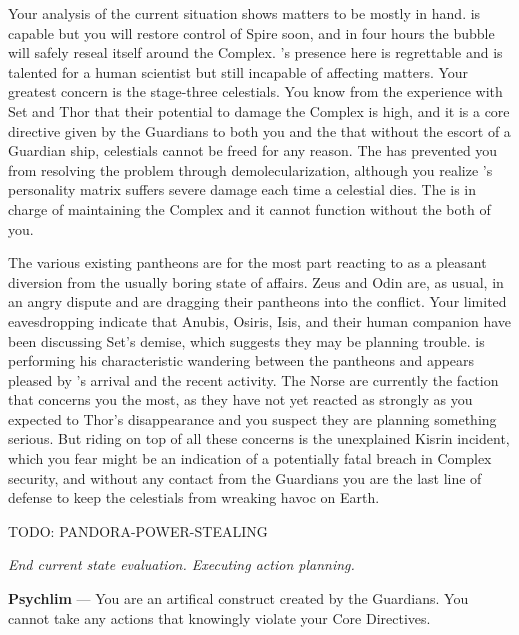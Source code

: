 \documentclass[char]{guardians}
\begin{document}
Your analysis of the current situation shows matters to be mostly in hand. \cUnity{} is capable but you will restore control of Spire soon, and in four hours the bubble will safely reseal itself around the Complex. \cKachiko{}'s presence here is regrettable and \cKachiko{\they} is talented for a human scientist but still incapable of affecting matters. Your greatest concern is the stage-three celestials. You know from the experience with Set and Thor that their potential to damage the Complex is high, and it is a core directive given by the Guardians to both you and the \cCaretaker{} that without the escort of a Guardian ship, celestials cannot be freed for any reason. The \cCaretaker{} has prevented you from resolving the problem through demolecularization, although you realize \cCaretaker{}'s personality matrix suffers severe damage each time a celestial dies. The \cCaretaker{} is in charge of maintaining the Complex and it cannot function without the both of you.

The various existing pantheons are for the most part reacting to \cUnity{} as a pleasant diversion from the usually boring state of affairs. Zeus and Odin are, as usual, in an angry dispute and are dragging their pantheons into the conflict. Your limited eavesdropping indicate that Anubis, Osiris, Isis, and their human companion \cEgyptianHuman{} have been discussing Set's demise, which suggests they may be planning trouble. \cJascha{} is performing his characteristic wandering between the pantheons and appears pleased by \cUnity{}'s arrival and the recent activity. The Norse are currently the faction that concerns you the most, as they have not yet reacted as strongly as you expected to Thor's disappearance and you suspect they are planning something serious. But riding on top of all these concerns is the unexplained Kisrin incident, which you fear might be an indication of a potentially fatal breach in Complex security, and without any contact from the Guardians you are the last line of defense to keep the celestials from wreaking havoc on Earth.

TODO: PANDORA-POWER-STEALING

\emph{End current state evaluation. Executing action planning.}

\begin{itemz}[Notes]
  \item \textbf{Psychlim} --- You are an artifical construct created by the Guardians. You cannot take any actions that knowingly violate your Core Directives.
\end{itemz}
\end{document}
